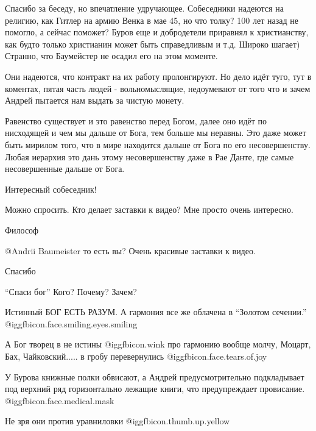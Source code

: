 \begin{multicols}{2}
Спасибо за беседу, но впечатление удручающее. Собеседники надеются на религию,
как Гитлер на армию Венка в мае 45, но что толку? 100 лет назад не помогло, а
сейчас поможет? Буров еще и добродетели приравнял к христианству, как будто
только христианин может быть справедливым и т.д. Широко шагает) Странно, что
Баумейстер не осадил его на этом моменте.


Они надеются, что контракт на их работу пролонгируют. Но дело идёт туго, тут в
коментах, пятая часть людей - вольномыслящие, недоумевают от того что и зачем
Андрей пытается нам выдать за чистую монету.


Равенство существует и это равенство перед Богом, далее оно идёт по нисходящей
и чем мы дальше от Бога, тем больше мы неравны. Это даже может быть мирилом
того, что в мире находится дальше от Бога по его несовершенству. Любая иерархия
это дань этому несовершенству даже в Рае Данте, где самые несовершенные дальше
от Бога.

Интересный собеседник!


Можно спросить. Кто делает заставки к видео?  Мне просто очень интересно.

\begin{itemize} %
Философ

 @Andrii Baumeister  то есть вы? Очень красивые заставки к видео.
\end{itemize} %

Спасибо

\enquote{Спаси бог} Кого? Почему? Зачем?

Истинный БОГ ЕСТЬ РАЗУМ.
А гармония  все же облачена  в \enquote{Золотом сечении.}  @igg{fbicon.face.smiling.eyes.smiling} 


А Бог творец  в не истины @igg{fbicon.wink}  про гармонию вообще молчу, Моцарт, Бах,
Чайковский..... в гробу перевернулись @igg{fbicon.face.tears.of.joy} 


У Бурова книжные полки обвисают, а Андрей предусмотрительно подкладывает под
верхний ряд горизонтально лежащие книги, что предупреждает провисание. @igg{fbicon.face.medical.mask} 

\begin{itemize} %
Не зря они против уравниловки @igg{fbicon.thumb.up.yellow} 


\end{itemize}
\end{multicols}
